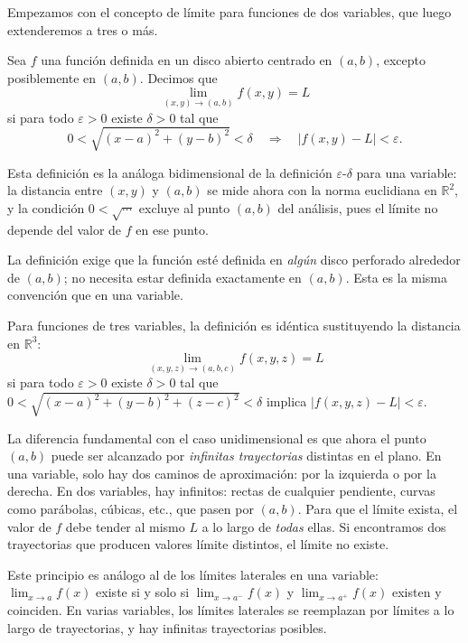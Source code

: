 Empezamos con el concepto de límite para funciones de dos variables,
que luego extenderemos a tres o más.

\begin{definition}
Sea $f$ una función definida en un disco abierto centrado en $(a,b)$,
excepto posiblemente en $(a,b)$. Decimos que
\[
\lim_{(x,y)\to(a,b)} f(x,y) = L
\]
si para todo $\varepsilon>0$ existe $\delta>0$ tal que
\[
0 < \sqrt{(x-a)^2 + (y-b)^2} < \delta
\quad\Longrightarrow\quad
|f(x,y)-L| < \varepsilon.
\]
\end{definition}

Esta definición es la análoga bidimensional de la definición
$\varepsilon$-$\delta$ para una variable: la distancia entre $(x,y)$ y
$(a,b)$ se mide ahora con la norma euclidiana en $\mathbb{R}^2$, y
la condición $0<\sqrt{\cdots}$ excluye al punto $(a,b)$ del análisis,
pues el límite no depende del valor de $f$ en ese punto.

\begin{rem}
La definición exige que la función esté definida en \emph{algún}
disco perforado alrededor de $(a,b)$; no necesita estar definida
exactamente en $(a,b)$. Esta es la misma convención que en una
variable.
\end{rem}

\begin{rem}
Para funciones de tres variables, la definición es idéntica
sustituyendo la distancia en $\mathbb{R}^3$:
\[
\lim_{(x,y,z)\to(a,b,c)} f(x,y,z) = L
\]
si para todo $\varepsilon>0$ existe $\delta>0$ tal que
$0<\sqrt{(x-a)^2+(y-b)^2+(z-c)^2}<\delta$ implica
$|f(x,y,z)-L|<\varepsilon$.
\end{rem}

La diferencia fundamental con el caso unidimensional es que ahora el
punto $(a,b)$ puede ser alcanzado por \emph{infinitas trayectorias}
distintas en el plano. En una variable, solo hay dos caminos de
aproximación: por la izquierda o por la derecha. En dos variables,
hay infinitos: rectas de cualquier pendiente, curvas como parábolas,
cúbicas, etc., que pasen por $(a,b)$. Para que el límite exista, el
valor de $f$ debe tender al mismo $L$ a lo largo de \emph{todas}
ellas. Si encontramos dos trayectorias que producen valores límite
distintos, el límite no existe.

\begin{rem}
Este principio es análogo al de los límites laterales en una variable:
$\lim_{x\to a}f(x)$ existe si y solo si $\lim_{x\to a^-}f(x)$ y
$\lim_{x\to a^+}f(x)$ existen y coinciden. En varias variables, los
límites laterales se reemplazan por límites a lo largo de trayectorias,
y hay infinitas trayectorias posibles.
\end{rem}


